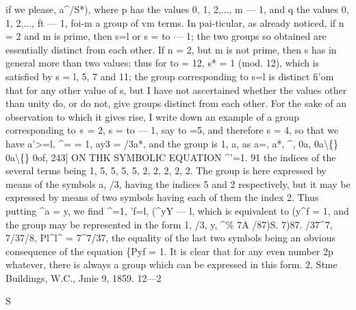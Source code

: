\documentclass[11pt,a4paper]{book}
\begin{document}
if  we  please,  a^/S*),  where  p  has  the  values  0,  1,  2,...,  m  — 1,  and  q  the  values
0,  1,  2,...,  ft  —  1,  foi-m  a  group  of  vm  terms.  In  pai-ticular,  as  already  noticed,  if  n  =  2
and  m  is  prime,  then  s=l  or  s  =  to  —  1;  the  two  groups  so  obtained  are  essentially
distinct  from  each  other.  If  n  =  2,  but  m  is  not  prime,  then  s  has  in  general  more
than  two  values:  thus  for  to  =  12,  s*  =  1  (mod.  12),  which  is  satisfied  by  s  =  l,  5,  7
and  11;  the  group  corresponding  to  s=l  is  distinct  fi'om  that  for  any  other  value
of  s,  but  I  have  not  ascertained  whether  the  values  other  than  unity  do,  or  do  not,
give  groups  distinct  from  each  other.
For  the  sake   of  an   observation  to  which  it  gives  rise,  I  write  down   an   example
of  a  group  corresponding  to  « =  2,  s  =  to  — 1,  say  to  =5,  and  therefore  s  =  4,  so  that
we  have
a'>=l,    ^=  =  1,  ay3  =  /3a*,
and  the  group  is
1,  a,  as  a=,  a*,  ^,  0a,  0a\textbackslash\{\}  0a\textbackslash\{\}  0of,
243]  ON   THK   SYMBOLIC   EQUATION    ^'=1.  91
the  indices  of  the  several  terms  being
1,    5,    5,   5,    5,    2,    2,    2,    2,    2.
The  group  is  here  expressed  by  means  of  the  symbols  a,  /3,  having  the  indices
5  and  2  respectively,  but  it  may  be  expressed  by  means  of  two  symbols  having  each
of  them  the  index  2.  Thus  putting  ^a  =  y,  we  find  ^=1,  'f=l,  (^yY  —  l,  which  is
equivalent  to  (y^f  =  1,  and  the  group  may  be  represented  in  the  form
1,  /3,  y,  ^\%  7A  /87)S.  7)87.  /37^7,  7/37/8,  Pl^l^  =  7^7/37,
the  equality  of  the  last  two  symbols  being  an  obvious  consequence  of  the  equation
\{Pyf  =  1.  It  is  clear  that  for  any  even  number  2p  whatever,  there  is  always  a  group
which  can  be  expressed  in  this  form.
2,  Stme  Buildings,   W.C.,  Jmie  9,    1859.
12—2


\newpage

S
\end{document}
